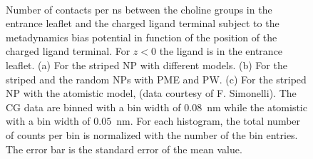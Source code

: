 \begin{figure}[th!]
	\center
	\\%
	\caption{Number of contacts per ns between the choline groups in the entrance leaflet and the charged ligand terminal subject to the metadynamics bias potential in function of the position of the charged ligand terminal. For $z<0$ the ligand is in the entrance leaflet. (a) For the striped \acs{NP} with different models. (b) For the striped and the random \acs{NP}s with \acs{PME} and \acs{PW}. (c) For the striped \ac{NP} with the atomistic model, (data courtesy of F. Simonelli). The \ac{CG} data are binned with a bin width of $0.08$~nm while the atomistic with a bin width of $0.05$~nm. For each histogram, the total number of counts per bin is normalized with the number of the bin entries. The error bar is the standard error of the mean value.}%
	\label{fig:NC3Contact}
\end{figure}
